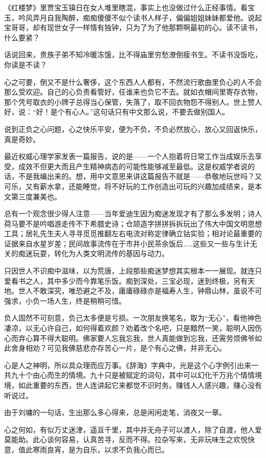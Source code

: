 \par 《红楼梦》里贾宝玉镇日在女人堆里瞎混，事实上也没做过什么正经事情。看宝玉，吟风弄月自我陶醉，痴痴傻傻不似个读书人样子，偏偏姐姐妹妹都爱他。说起宝哥哥，却有现世女子一样情有独钟，只为了为了他那颗啊最初的心。读不读书，什么要紧？
\par 话说回来，贵族子弟不知冷暖冻饿，比不得庙里穷愁潦倒瘦书生。不读书没饭吃，你读是不读？
\par 心之可要，倒又不是什么奢侈，这个东西人人都有，不然流行歌曲里负心的人不会那么受欢迎。自己的心负责看管好，任谁来也负它不去。就如衣帽间里寄存衣物，那个凭号取衣的小牌子总得当心保管，失落了，取不回衣物怨不得别人。世上赞人好，说：“好！是个有心人。”这句话只有中文那么说，不要去做别国人。
\par 说到正负之心问题，心之快乐平安，便为不负，不负必然放心，放心又回返快乐，真是奇妙。
\par 最近权威心理学家发表一篇报告，说的是——一个人抱着将日常工作当成娱乐去享受，成效不但更大而且产生精神病态的可能性能够减至最低。这是权威学者说的话，不是我编出来的。想，用中文意思来讲这篇报告不就是——恭敬地玩世吗？又可乐，又有薪水拿，还能睡觉，将不好玩的工作创造出可玩的兴趣加成绩来，是本文第三度兼美也。
\par 总有一个观念很少得人注意——当年爱迪生因为痴迷发现才有了那么多发明；诗人荷马要不是吟唱游走传不下希腊史诗；仓颉造字拼拼拆拆玩出了伟大中国文明思想工具；居礼先生夫人寻寻觅觅推翻左右电流对称定律确立钴实验；相对论最重要的证据来自水星岁差；民间故事流传在于市井小民茶余饭后……这些又一些与生计无关的痴迷玩耍，转化为人类文明流传的基因与动力。
\par 只因世人不识痴中滋味，以为荒唐，上段那些痴迷梦想其实根本一一展现。就连只爱看书之人，其中多少而今靠笔乐饭。痴到深处，三宝必现，迷到终极，另有天地。世人不敢深究，唯恐避之不及，庸庸碌碌亦是福寿人生，钟鼎山林，虽说不可强求，小负一场人生，终是稍稍可惜。
\par 负人固然不可刻意，负己太多便是亏损。一次朋友换笔名，取为“无心”，看他神色凄凉，以无心许自己，如何得着欢颜？劝着改个名吧，只是黯然一笑，聪明人因伤心而弃心算不得大聪明。佛家要人忘我忘我，世人真能做到忘我，还需劳烦佛爷如此舍身相劝？可见我佛慈悲亦存苦心一片，是个有心之佛，并非无心。
\par 心是人之神明，所以具众理而应万事。《辞海》字典中，光是这个心字例引出来一共九十个由心而生的情境。九十只是被赋定的词句，其中可以幻化千万兆个情情境境，如此重要的东西，世人连讲起它来都觉不识时务。赚钱人人感兴趣，赚心没有听说过。
\par 由于刘墉的一句话，生出那么多心得来，总是闲闲走笔，消夜又一章。
\par 心之何如，有似万丈迷津，遥亘千里，其中并无舟子可以渡人，除了自渡，他人爱莫能助。此心谈何容易，认真苦寻，反而不得。拉杂写来，无非玩味生之欢悦快意，值此寒雨良宵，是为自乐，以求不负我心而已。



